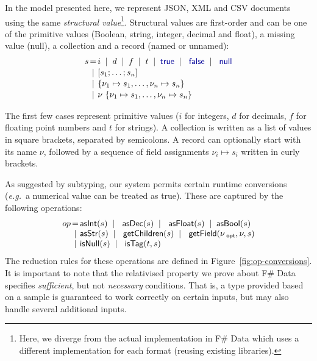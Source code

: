 \documentclass[preprint]{sigplanconf}
\newcommand{\kvd}[1]{\textnormal{\textcolor{kvdclr}{\sffamily #1}}}
\newcommand{\num}[1]{\textnormal{\textcolor{numclr}{\sffamily #1}}}
\newcommand{\ident}[1]{\textnormal{\sffamily #1}}
\newcommand{\lsep}[0]{\;\; | \;\;}
\newcommand{\narrow}[1]{\hspace{-0.85em} #1 \hspace{-0.85em}}
\begin{document}
In the model presented here, we represent JSON, XML and CSV documents using the same 
\emph{structural value}\footnote{Here, we diverge from the actual implementation in F\# Data which 
uses a different implementation for each format (reusing existing libraries).}. Structural values are 
first-order and can be one of the primitive values (Boolean, string, integer, decimal and float), a 
missing value (\kvd{null}), a collection and a record (named or unnamed):
%
\begin{equation*}
\begin{array}{lcl}
 s  &\narrow{=}& i \lsep d \lsep f \lsep t \lsep \kvd{true} \lsep \kvd{false} \lsep \kvd{null} \\[0.1em]
    &\narrow{|}& [s_1; \ldots; s_n] \\[0.1em]
    &\narrow{|}& \{ \nu_1 \mapsto s_1, \ldots, \nu_n \mapsto s_n \}\\[0.1em]
    &\narrow{|}& \nu~\{ \nu_1 \mapsto s_1, \ldots, \nu_n \mapsto s_n \} \\
\end{array}
\end{equation*}

\noindent
The first few cases represent primitive values ($i$ for integers, $d$ for decimals, $f$ for floating
point numbers and $t$ for strings). A collection is written as a list of values in square brackets, 
separated by semicolons. A record can optionally start with its name $\nu$, followed by a sequence of 
field assignments $\nu_i \mapsto s_i$ written in curly brackets.

As suggested by subtyping, our system permits certain runtime conversions (\emph{e.g.}~a numerical 
value \num{1} can be treated as \kvd{true}). These are captured by the following operations:
%
\begin{equation*}
\begin{array}{lcl}
 op &\narrow{=}& \ident{asInt}(s) \lsep \ident{asDec}(s) \lsep \ident{asFloat}(s) \lsep \ident{asBool}(s)  \\
    &\narrow{|}& \ident{asStr}(s) \lsep \ident{getChildren}(s) \lsep \ident{getField}(\nu_{\ident{opt}}, \nu, s)\\
    &\narrow{|}& \ident{isNull}(s) \lsep \ident{isTag}(t, s)
\end{array}
\end{equation*}
%
The reduction rules for these operations are defined in Figure~\ref{fig:op-conversions}. It is important
to note that the relativised property we prove about F\# Data specifies \emph{sufficient}, but
not \emph{necessary} conditions. That is, a type provided based on a sample is guaranteed to work 
correctly on certain inputs, but may also handle several additional inputs.
\end{document}
